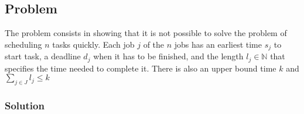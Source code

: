 \documentclass[11pt]{article}
\begin{document}
\subsection*{Problem}
The problem consists in showing that it is not possible to solve the problem of scheduling $n$ tasks quickly. Each job  $j$ of the $n$ jobs has an earliest time $s_j$ to start task, a deadline $d_j$ when it has to be finished, and the length $l_j \in \mathbb{N}$ that specifies the time needed to complete it. There is also an upper bound time $k$ and $\sum\limits_{j \in J}l_j \le k$
\subsubsection*{Solution}
\end{document}
